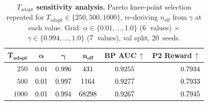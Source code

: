 \begin{table}[htbp]
\centering
\caption{%
  \textbf{$T_{\text{adapt}}$ sensitivity analysis.}
  Pareto knee-point selection repeated for
  $T_{\text{adapt}} \in \{250, 500, 1000\}$, re-deriving
  $n_{\text{eff}}$ from $\gamma$ at each value.
  Grid: $\alpha \in \{0.01, \ldots, 1.0\}$
  ($6$~values) $\times$
  $\gamma \in \{0.994, \ldots, 1.0\}$ ($7$~values),
  val split, 20~seeds.%
}
\label{tab:t_adapt_sensitivity}
\small
\begin{tabular}{@{}rccccr@{}}
\toprule
$\boldsymbol{T_{\text{adapt}}}$
  & $\boldsymbol{\alpha}$
  & $\boldsymbol{\gamma}$
  & $\boldsymbol{n_{\text{eff}}}$
  & \textbf{BP AUC\,$\uparrow$}
  & \textbf{P2 Reward\,$\uparrow$} \\
\midrule
$250$  & $0.01$  & $0.996$  & $431$  & $0.9255$  & $0.7934$ \\
$500$  & $0.01$  & $0.997$  & $1164$  & $0.9277$  & $0.7933$ \\
$1000$ & $0.01$ & $0.994$ & $68298$ & $0.9267$ & $0.7945$ \\
\bottomrule
\end{tabular}
\end{table}
